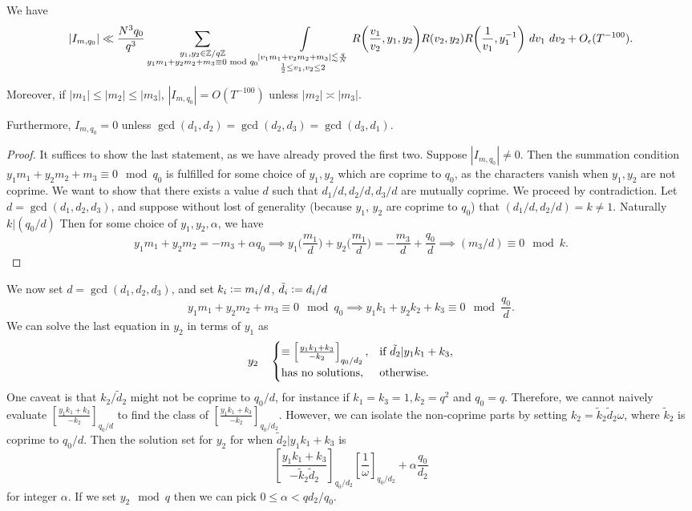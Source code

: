 \begin{proposition}
    We have 
    \[
        |I_{m,q_0}|\ll \frac{N^3q_0}{q^3}\sum_{\substack{y_1,y_2 \in\mathbb{Z}/q\mathbb{Z} \\ y_1m_1+y_2m_2+m_3\equiv 0 \mod q_0}}\int\displaylimits_{\substack{
            |v_1m_1+v_2m_2+m_3|\lesssim \frac{q}{N}\\
            \frac{1}{2}\leq v_1,v_2\leq 2
    }}  R{\left(\frac{v_1}{v_2},y_1,y_2\right)}R {\left(v_2,y_2\right)}R{\left(\frac{1}{v_1},y_1^{-1}\right)} \ dv_1\ dv_2+O_{\epsilon}(T^{-100}).
        \]

        Moreover, if $|m_1|\leq|m_2|\leq |m_3|$, $|I_{m,q_0}|=O(T^{-100})$ unless $|m_2|\asymp|m_3|$. 
        
        Furthermore, $I_{m,q_0}=0$ unless $\gcd(d_1,d_2)=\gcd(d_2,d_3)=\gcd(d_3,d_1)$.
        
\end{proposition}
\begin{proof}
    It suffices to show the last statement, as we have already proved the first two. 
    Suppose $|I_{m,q_0}|\neq 0$. Then the summation condition $y_1m_1+y_2m_2+m_3\equiv 0 \mod q_0$ is fulfilled for some choice of $y_1,y_2$ which are coprime to $q_0$, as the characters vanish when $y_1,y_2$ are not coprime. We want to show that there exists a value $d$ such that $d_1/d, d_2/d, d_3/d$ are mutually coprime. We proceed by contradiction. Let $d=\gcd(d_1,d_2,d_3)$, and suppose without lost of generality (because $y_1$, $y_2$ are coprime to $q_0$) that $(d_1/d,d_2/d)= k\neq 1$. Naturally $k|(q_0/d)$ Then for some choice of $y_1,y_2, \alpha$, we have \[
    y_1m_1+y_2m_2 = -m_3 + \alpha q_0 \implies y_1 \big(\frac{m_1}{d}\big)+ y_2 \big(\frac{m_1}{d}\big) = -\frac{m_3}{d} + \frac{q_0}{d} \implies (m_3/d) \equiv 0 \mod k.
    \]
\end{proof}

We now set $d=\gcd(d_1,d_2,d_3)$, and set $k_i \mathrel{\mathop:}= m_i/d$, $\tilde{d}_i\mathrel{\mathop:}= d_i/d$ \[
y_1m_1+y_2m_2+m_3\equiv 0 \mod q_0 \implies y_1k_1+y_2k_2 + k_3 \equiv 0 \mod \frac{q_0}{d}.
\]
We can solve the last equation in $y_2$ in terms of $y_1$ as \[
y_2 \quad \begin{cases}
     \equiv \left[\frac{y_1k_1+k_3}{-k_2}\right]_{q_0/d_2} , & \textrm{if $\tilde{d_2}|y_1k_1+k_3$}, \\
      \textrm{has no solutions}, & \rm{otherwise}.
\end{cases}
\]
One caveat is that $k_2/\tilde{d}_2$ might not be coprime to $q_0/d$, for instance if $k_1=k_3=1,k_2=q^2$ and $q_0=q$. Therefore, we cannot naively evaluate $\left[\frac{y_1k_1+k_3}{-k_2}\right]_{q_0/d}$ to find the class of $\left[\frac{y_1k_1+k_3}{-k_2}\right]_{q_0/d_2}$. However, we can isolate the 
non-coprime parts by setting $k_2 = \tilde{k}_2 \tilde{d}_2 \omega$, where $\tilde{k}_2$ is coprime to $q_0/d$. Then the solution set for $y_2$ for when $\tilde{d}_2|y_1k_1+k_3$ is \[
    \left[\frac{y_1k_1+k_3}{-\tilde{k}_2\tilde{d}_2}\right]_{q_0/d_2}\left[\frac{1}{\omega}\right]_{q_0/d_2}+ \alpha \frac{q_0}{d_2}
\]
for integer $\alpha$. If we set $y_2\mod q$ then we can pick $0\leq \alpha < qd_2/q_0 $.


